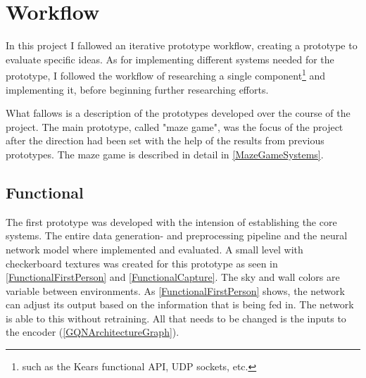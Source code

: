 
\chapter{Workflow}
In this project I fallowed an iterative prototype workflow, creating a prototype to evaluate specific ideas. As for implementing different systems needed for the prototype, I followed the workflow of researching a single component\footnote{such as the Kears functional API, UDP sockets, etc.} and implementing it, before beginning further researching efforts.

What fallows is a description of the prototypes developed over the course of the project. The main prototype, called "maze game", was the focus of the project after the direction had been set with the help of the results from previous prototypes. The maze game is described in detail in \cref{MazeGameSystems}.


\section{Functional}
The first prototype was developed with the intension of establishing the core systems. The entire data generation- and preprocessing pipeline and the neural network model where implemented and evaluated. A small level with checkerboard textures was created for this prototype as seen in \cref{FunctionalFirstPerson} and \cref{FunctionalCapture}. The sky and wall colors are variable between environments. As \cref{FunctionalFirstPerson} shows, the network can adjust its output based on the information that is being fed in. The network is able to this without retraining. All that needs to be changed is the inputs to the encoder (\cref{GQNArchitectureGraph}).


